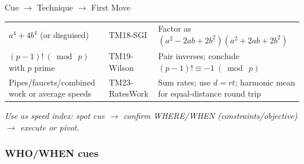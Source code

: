 \documentclass{article}
\begin{document}
\begin{classifybox}{Cue $\rightarrow$ Technique $\rightarrow$ First Move}
\begin{center}
\begin{tabularx}{\textwidth}{|>{\raggedright\arraybackslash}X|>{\raggedright\arraybackslash}m{}|>{\raggedright\arraybackslash}X|}
$a^4+4b^4$ (or disguised) & TM18-SGI & Factor as $(a^2-2ab+2b^2)(a^2+2ab+2b^2)$ \\
$(p{-}1)!\ (\bmod\ p)$ with $p$ prime & TM19-Wilson & Pair inverses; conclude $(p{-}1)!\equiv -1\ (\bmod\ p)$ \\
Pipes/faucets/combined work or average speeds & TM23-RatesWork & Sum rates; use $d=rt$; harmonic mean for equal-distance round trip \\
\hline
\end{tabularx}
\end{center}
\smallskip
\textit{Use as speed index: spot cue $\rightarrow$ confirm WHERE/WHEN (constraints/objective) $\rightarrow$ execute or pivot.}
\end{classifybox}

\smallskip
\subsubsection{WHO/WHEN cues}
\end{document}
